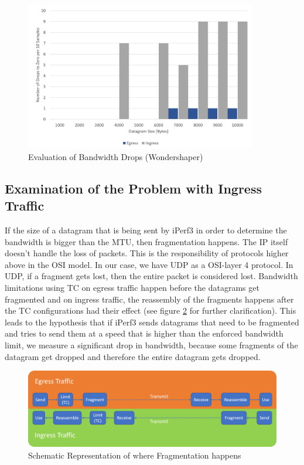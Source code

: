 \begin{figure}[h]
	\centering
	\includegraphics[width=0.9\textwidth]{img/Evaluation-Zeros-Wondershaper.png}
	\caption{Evaluation of Bandwidth Drops (Wondershaper)}
	\label{Evaluation of the Bandwidth Drops (Wondershaper)}
\end{figure}

\newpage
\subsection{Examination of the Problem with Ingress Traffic}\label{Examination of the Problem with Ingress Traffic}

If the size of a datagram that is being sent by iPerf3 in order to determine the bandwidth is bigger than the \acs{MTU}, then fragmentation happens. The \acl{IP} itself doesn't handle the loss of packets. This is the responsibility of protocols higher above in the \acs{OSI} model. In our case, we have \acs{UDP} as a  \acs{OSI}-layer 4 protocol. In \acs{UDP}, if a fragment gets lost, then the entire packet is considered lost. Bandwidth limitations using \acs{TC} on egress traffic happen before the datagrams get fragmented and on ingress traffic, the reassembly of the fragments happens after the \acs{TC} configurations had their effect (see figure \ref{Schematic Representation of where Fragmentation happens} for further clarification). This leads to the hypothesis that if iPerf3 sends datagrams that need to be fragmented and tries to send them at a speed that is higher than the enforced bandwidth limit, we measure a significant drop in bandwidth, because some fragments of the datagram get dropped and therefore the entire datagram gets dropped.

\begin{figure}[h]
	\centering
	\includegraphics[width=\textwidth]{img/Fragmentation.png}
	\caption{Schematic Representation of where Fragmentation happens}
	\label{Schematic Representation of where Fragmentation happens}
\end{figure}

